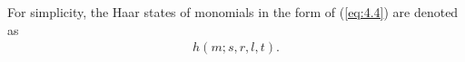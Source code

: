 \documentclass[table,a4paper,reqno]{amsart}
\numberwithin{equation}{section}
\newtheorem*{remark}{Remark}
\newtheorem{proposition}[theorem]{Proposition}
\theoremstyle{definition}
\begin{document}
For simplicity, the Haar states of monomials in the form of (\ref{eq:4.4}) are denoted as
\begin{align}\label{eq:4.5}
    h(m;s,r,l,t).
\end{align}
\end{document}
